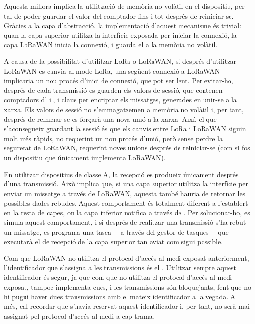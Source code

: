 \documentclass{tfgitic}[2024/07/01]
\begin{document}
{Aquesta millora implica la utilització de memòria no volàtil en el dispositiu, per tal de poder guardar el valor del comptador fins i tot després de reiniciar-se. Gràcies a la capa d'abstracció, la implementació d'aquest mecanisme és trivial: quan la capa superior utilitza la interfície exposada per iniciar la connexió, la capa LoRaWAN inicia la connexió, i guarda el  a la memòria no volàtil.

A causa de la possibilitat d'utilitzar LoRa o LoRaWAN, si després d'utilitzar LoRaWAN es canvia al mode LoRa, una següent connexió a LoRaWAN implicaria un nou procés d'inici de connexió, que pot ser lent. Per evitar-ho, després de cada transmissió es guarden els valors de sessió, que contenen comptadors d' i , i claus per encriptar els missatges, generades en unir-se a la xarxa. Els valors de sessió no s'emmagatzemen a memòria no volàtil i, per tant, després de reiniciar-se es forçarà una nova unió a la xarxa. Així, el que s'aconsegueix guardant la sessió és que els canvis entre LoRa i LoRaWAN siguin molt més ràpids, no requerint un nou procés d'unió, però sense perdre la seguretat de LoRaWAN, requerint noves unions després de reiniciar-se (com si fos un dispositiu que únicament implementa LoRaWAN).

En utilitzar dispositius de classe A, la recepció es produeix únicament després d'una transmissió. Això implica que, si una capa superior utilitza la interfície per enviar un missatge a través de LoRaWAN, aquesta també hauria de retornar les possibles dades rebudes. Aquest comportament és totalment diferent a l'establert en la resta de capes, on la capa inferior notifica a través de . Per solucionar-ho, es simula aquest comportament, i si després de realitzar una transmissió s'ha rebut un missatge, es programa una tasca ---a través del gestor de tasques--- que executarà el  de recepció de la capa superior tan aviat com sigui possible. 

Com que LoRaWAN no utilitza el protocol d'accés al medi exposat anteriorment, l'identificador que s'assigna a les transmissions és el . Utilitzar sempre aquest identificador és segur, ja que com que no utilitza el protocol d'accés al medi exposat, tampoc implementa cues, i les transmissions són bloquejants, fent que no hi pugui haver dues transmissions amb el mateix identificador a la vegada. A més, cal recordar que s'havia reservat aquest identificador i, per tant, no serà mai assignat pel protocol d'accés al medi a cap trama.

}
\end{document}
